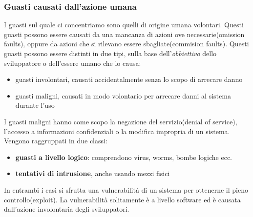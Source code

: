  \subsubsection{Guasti causati dall'azione umana}
 I guasti sul quale ci concentriamo sono quelli di origine umana volontari. Questi guasti possono essere causati da una mancanza di 
 azioni ove necessarie(omission faults), oppure da azioni che si rilevano essere sbagliate(commision faults). Questi guasti possono
 essere distinti in due tipi, sulla base dell'\emph{obbiettivo} dello sviluppatore o dell'essere umano che lo causa:
 \begin{itemize}
     \item guasti involontari, causati  accidentalmente senza lo scopo di arrecare danno
     \item guasti maligni, causati in modo volontario per arrecare danni al sistema durante l'uso
 \end{itemize}
 I guasti maligni hanno  come scopo la negazione del servizio(denial of service), l'accesso a informazioni confidenziali
 o la modifica impropria di un sistema.
 Vengono raggruppati in due classi:
 \begin{itemize}
     \item \textbf{guasti a livello logico}: comprendono virus, worms, bombe logiche ecc.
     \item \textbf{tentativi di intrusione}, anche usando mezzi fisici
 \end{itemize}
 In entrambi i casi si sfrutta una vulnerabilità di un sistema per ottenerne il pieno controllo(exploit).
 La vulnerabilità solitamente è a livello software ed è causata dall'azione involontaria degli sviluppatori.

